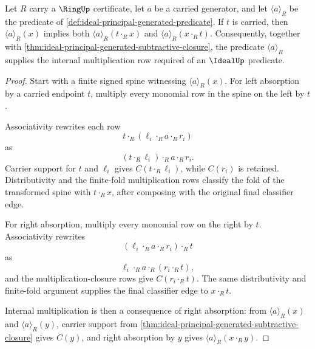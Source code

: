 \begin{theorem}
\label{thm:ideal-principal-generated-absorption-closure}
Let $R$ carry a $\RingUp$ certificate, let $a$ be a carried generator, and let $\langle a\rangle_R$ be the predicate of \autoref{def:ideal-principal-generated-predicate}. If $t$ is carried, then $\langle a\rangle_R(x)$ implies both $\langle a\rangle_R(t\cdot_R x)$ and $\langle a\rangle_R(x\cdot_R t)$. Consequently, together with \autoref{thm:ideal-principal-generated-subtractive-closure}, the predicate $\langle a\rangle_R$ supplies the internal multiplication row required of an $\IdealUp$ predicate.
\end{theorem}
\begin{proof}
Start with a finite signed spine witnessing $\langle a\rangle_R(x)$. For left absorption by a carried endpoint $t$, multiply every monomial row in the spine on the left by $t$.

Associativity rewrites each row
$$
t\cdot_R(\ell_i\cdot_R a\cdot_R r_i)
$$
as
$$
(t\cdot_R\ell_i)\cdot_R a\cdot_R r_i.
$$
Carrier support for $t$ and $\ell_i$ gives $C(t\cdot_R\ell_i)$, while $C(r_i)$ is retained. Distributivity and the finite-fold multiplication rows classify the fold of the transformed spine with $t\cdot_R x$, after composing with the original final classifier edge.

For right absorption, multiply every monomial row on the right by $t$. Associativity rewrites
$$
(\ell_i\cdot_R a\cdot_R r_i)\cdot_R t
$$
as
$$
\ell_i\cdot_R a\cdot_R(r_i\cdot_R t),
$$
and the multiplication-closure rows give $C(r_i\cdot_R t)$. The same distributivity and finite-fold argument supplies the final classifier edge to $x\cdot_R t$.

Internal multiplication is then a consequence of right absorption: from $\langle a\rangle_R(x)$ and $\langle a\rangle_R(y)$, carrier support from \autoref{thm:ideal-principal-generated-subtractive-closure} gives $C(y)$, and right absorption by $y$ gives $\langle a\rangle_R(x\cdot_R y)$.
\end{proof}

